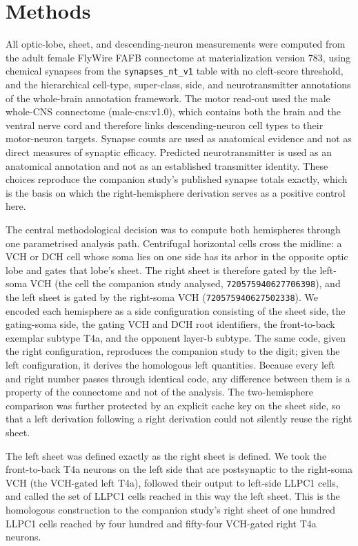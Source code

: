 \documentclass[11pt]{article}
\newcommand{\rid}[1]{\texttt{\small #1}}
\begin{document}
\section{Methods}

All optic-lobe, sheet, and descending-neuron measurements were computed from the adult female
FlyWire FAFB connectome at materialization version 783, using chemical synapses from the
\texttt{synapses\_nt\_v1} table with no cleft-score threshold, and the hierarchical cell-type,
super-class, side, and neurotransmitter annotations of the whole-brain annotation framework. The
motor read-out used the male whole-CNS connectome (male-cns:v1.0), which contains both the brain
and the ventral nerve cord and therefore links descending-neuron cell types to their
motor-neuron targets. Synapse counts are used as anatomical evidence and not as direct measures
of synaptic efficacy. Predicted neurotransmitter is used as an anatomical annotation and not as
an established transmitter identity. These choices reproduce the companion study's published
synapse totals exactly, which is the basis on which the right-hemisphere derivation serves as a
positive control here.

The central methodological decision was to compute both hemispheres through one parametrised
analysis path. Centrifugal horizontal cells cross the midline: a VCH or DCH cell whose soma lies
on one side has its arbor in the opposite optic lobe and gates that lobe's sheet. The right
sheet is therefore gated by the left-soma VCH (the cell the companion study analysed,
\rid{720575940627706398}), and the left sheet is gated by the right-soma VCH
(\rid{720575940627502338}). We encoded each hemisphere as a side configuration consisting of the
sheet side, the gating-soma side, the gating VCH and DCH root identifiers, the front-to-back
exemplar subtype T4a, and the opponent layer-b subtype. The same code, given the right
configuration, reproduces the companion study to the digit; given the left configuration, it
derives the homologous left quantities. Because every left and right number passes through
identical code, any difference between them is a property of the connectome and not of the
analysis. The two-hemisphere comparison was further protected by an explicit cache key on the
sheet side, so that a left derivation following a right derivation could not silently reuse the
right sheet.

The left sheet was defined exactly as the right sheet is defined. We took the front-to-back T4a
neurons on the left side that are postsynaptic to the right-soma VCH (the VCH-gated left T4a),
followed their output to left-side LLPC1 cells, and called the set of LLPC1 cells reached in this
way the left sheet. This is the homologous construction to the companion study's right sheet of
one hundred LLPC1 cells reached by four hundred and fifty-four VCH-gated right T4a neurons.
\end{document}
